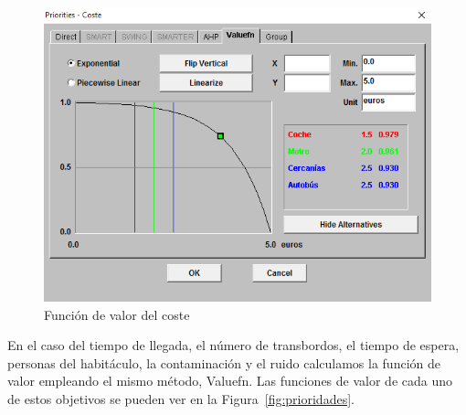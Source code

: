 \documentclass[12pt,a4paper,twoside,openright,titlepage,final]{article}
\begin{document}
\begin{figure}[tbph!]
	\centering
	\includegraphics[width=0.5\linewidth]{imagenes/prioridades_coste}
	\caption{Función de valor del coste}
	\label{fig:prioridades_coste}
\end{figure}

En el caso del tiempo de llegada, el número de transbordos, el tiempo de espera, personas del habitáculo, la contaminación y el ruido calculamos la función de valor empleando el mismo método, Valuefn. Las funciones de valor de cada uno de estos objetivos se pueden ver en la Figura~\ref{fig:prioridades}.
\end{document}
